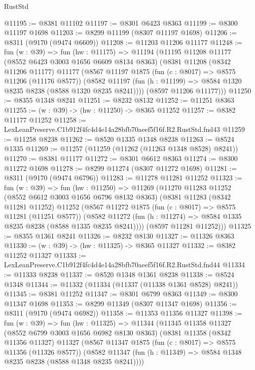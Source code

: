 \begin{lexlean}{RustStd}
\begin{coremodule}
@11195 := @8381 @11102
@11197 := @8301 @6423 @8363
@11199 := @8300 @11197 @1698
@11203 := @8299 @11199 (@8307 @11197 @1698)
@11206 := @8311 (@9170 (@9474 @6609))
@11208 := @11203 @11206 @11177
@11248 := fun (w : @39) =>
  fun (hw : @11175) =>
  @11194
    (@11195
      @11208
      @11177
      (@8552 @6423 @3003 @1656 @6609 @8134 @8363)
      (@8381
        @11208
        (@8342 @11206 @11177)
        @11177
        (@8567
          @11197
          @1875
          (fun (c : @8017) => @8575 @11206 (@11176 @8577))
          (@8582 @11197 (fun (h : @11199) => @8584 @1320 @8235 @8238 (@8588 @1320 @8235 @8241))))
        (@8597 @11206 @11177)))
@11250 := @8355 @1348 @8241
@11251 := @8232 @8132
@11252 := @11251 @8363
@11255 := (w : @39) -> (hw : @11250) -> @8365 @11252
@11257 := @8382 @11177 @11252
@11258 := LexLeanPreserve.C1b912f4fc4d4e14a28bfb70aeef5f16f.R2.RustStd.fnd43
@11259 := @11258 @8238
@11262 := @8520 @1335 @1348 @8238
@11263 := @8524 @1335
@11269 := @11257 (@11259 (@11262 (@11263 @1348 @8528) @8241))
@11270 := @8381 @11177
@11272 := @8301 @6612 @8363
@11274 := @8300 @11272 @1698
@11278 := @8299 @11274 (@8307 @11272 @1698)
@11281 := @8311 (@9170 (@9474 @6796))
@11283 := @11278 @11281 @11252
@11323 := fun (w : @39) =>
  fun (hw : @11250) =>
  @11269
    (@11270
      @11283
      @11252
      (@8552 @6612 @3003 @1656 @6796 @8132 @8363)
      (@8381
        @11283
        (@8342 @11281 @11252)
        @11252
        (@8567
          @11272
          @1875
          (fun (c : @8017) => @8575 @11281 (@11251 @8577))
          (@8582 @11272 (fun (h : @11274) => @8584 @1335 @8235 @8238 (@8588 @1335 @8235 @8241))))
        (@8597 @11281 @11252)))
@11325 := @8355 @1361 @8241
@11326 := @8232 @8130
@11327 := @11326 @8363
@11330 := (w : @39) -> (hw : @11325) -> @8365 @11327
@11332 := @8382 @11252 @11327
@11333 := LexLeanPreserve.C1b912f4fc4d4e14a28bfb70aeef5f16f.R2.RustStd.fnd44
@11334 := @11333 @8238
@11337 := @8520 @1348 @1361 @8238
@11338 := @8524 @1348
@11344 := @11332 (@11334 (@11337 (@11338 @1361 @8528) @8241))
@11345 := @8381 @11252
@11347 := @8301 @6799 @8363
@11349 := @8300 @11347 @1698
@11353 := @8299 @11349 (@8307 @11347 @1698)
@11356 := @8311 (@9170 (@9474 @6982))
@11358 := @11353 @11356 @11327
@11398 := fun (w : @39) =>
  fun (hw : @11325) =>
  @11344
    (@11345
      @11358
      @11327
      (@8552 @6799 @3003 @1656 @6982 @8130 @8363)
      (@8381
        @11358
        (@8342 @11356 @11327)
        @11327
        (@8567
          @11347
          @1875
          (fun (c : @8017) => @8575 @11356 (@11326 @8577))
          (@8582 @11347 (fun (h : @11349) => @8584 @1348 @8235 @8238 (@8588 @1348 @8235 @8241))))

\end{coremodule}
\end{lexlean}
